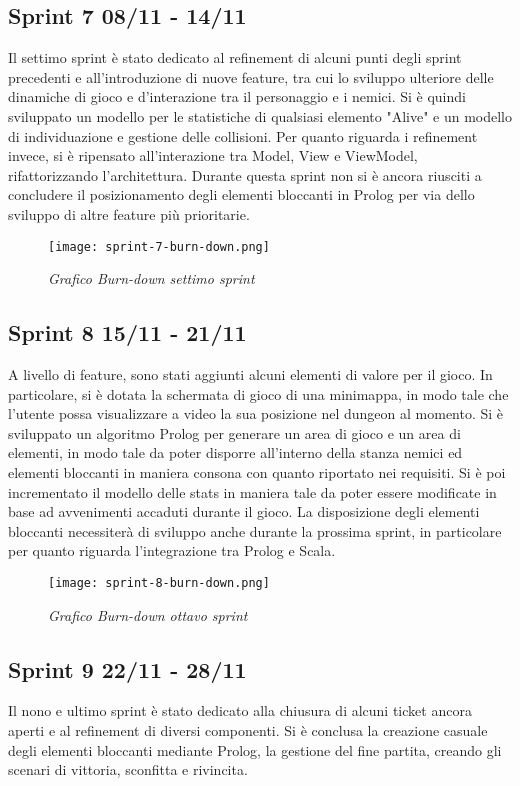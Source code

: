 \newpage
\subsection{Sprint 7 08/11 - 14/11}
Il settimo sprint è stato dedicato al refinement di alcuni punti degli sprint precedenti e all'introduzione di nuove feature, tra cui lo sviluppo ulteriore delle dinamiche di gioco e d'interazione tra il personaggio e i nemici. 
Si è quindi sviluppato un modello per le statistiche di qualsiasi elemento "Alive" e un modello di individuazione e gestione delle collisioni. 
Per quanto riguarda i refinement invece, si è ripensato all'interazione tra Model, View e ViewModel, rifattorizzando l'architettura. 
Durante questa sprint non si è ancora riusciti a concludere il posizionamento degli elementi bloccanti in Prolog per via dello sviluppo di altre feature più prioritarie.
\begin{figure}[H]
    \centering
    \texttt{[image: sprint-7-burn-down.png]}
    \caption{\textit{Grafico Burn-down settimo sprint}} 
\end{figure}

\newpage
\subsection{Sprint 8 15/11 - 21/11}
A livello di feature, sono stati aggiunti alcuni elementi di valore per il gioco. 
In particolare, si è dotata la schermata di gioco di una minimappa, in modo tale che l'utente possa visualizzare a video la sua posizione nel dungeon al momento. 
Si è sviluppato un algoritmo Prolog per generare un area di gioco e un area di elementi, 
in modo tale da poter disporre all'interno della stanza nemici ed elementi bloccanti in maniera consona con quanto riportato nei requisiti.
Si è poi incrementato il modello delle stats in maniera tale da poter essere modificate in base ad avvenimenti accaduti durante il gioco. 
La disposizione degli elementi bloccanti necessiterà di sviluppo anche durante la prossima sprint, in particolare per quanto riguarda l'integrazione tra Prolog e Scala. 
\begin{figure}[H]
    \centering
    \texttt{[image: sprint-8-burn-down.png]}
    \caption{\textit{Grafico Burn-down ottavo sprint}} 
\end{figure}

\newpage
\subsection{Sprint 9 22/11 - 28/11}
Il nono e ultimo sprint è stato dedicato alla chiusura di alcuni ticket ancora aperti e al refinement di diversi componenti. 
Si è conclusa la creazione casuale degli elementi bloccanti mediante Prolog, la gestione del fine partita, creando gli scenari di vittoria, sconfitta e rivincita.

